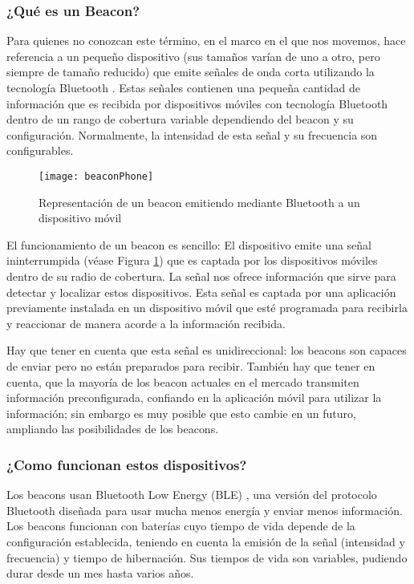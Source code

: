 \subsubsection{¿Qué es un Beacon?}

Para quienes no conozcan este término, en el marco en el que nos movemos, hace referencia a un pequeño dispositivo (sus tamaños varían de uno a otro, pero siempre de tamaño reducido) que emite señales de onda corta utilizando la tecnología Bluetooth \cite{URL::Bluetooth}. Estas señales contienen una pequeña cantidad de información que es recibida por dispositivos móviles con tecnología Bluetooth dentro de un rango de cobertura variable dependiendo del beacon y su configuración. Normalmente, la intensidad de esta señal y su frecuencia son configurables.

\begin{figure}[h]
	\centering
	\texttt{[image: beaconPhone]}
	\caption{Representación de un beacon emitiendo mediante Bluetooth a un dispositivo móvil}
	\label{fig:beaconBluetooth}
\end{figure}

El funcionamiento de un beacon es sencillo: El dispositivo emite una señal ininterrumpida (véase Figura \ref{fig:beaconBluetooth}) que es captada por los dispositivos móviles dentro de su radio de cobertura. La señal nos ofrece información que sirve para detectar y localizar estos dispositivos. Esta señal es captada por una aplicación previamente instalada en un dispositivo móvil que esté programada para recibirla y reaccionar de manera acorde a la información recibida.


Hay que tener en cuenta que esta señal es unidireccional: los beacons son capaces de enviar pero no están preparados para recibir. También hay que tener en cuenta, que la mayoría de los beacon actuales en el mercado transmiten información preconfigurada, confiando en la aplicación móvil para utilizar la información; sin embargo es muy posible que esto cambie en un futuro, ampliando las posibilidades de los beacons.

\subsubsection{¿Como funcionan estos dispositivos?}

Los beacons usan Bluetooth Low Energy (BLE) \cite{URL::BluetoothLowEnergy}, una versión del protocolo Bluetooth diseñada para usar mucha menos energía y enviar menos información. Los beacons funcionan con baterías cuyo tiempo de vida depende de la configuración establecida, teniendo en cuenta la emisión de la señal (intensidad y frecuencia) y tiempo de hibernación. Sus tiempos de vida son variables, pudiendo durar desde un mes hasta varios años. 

